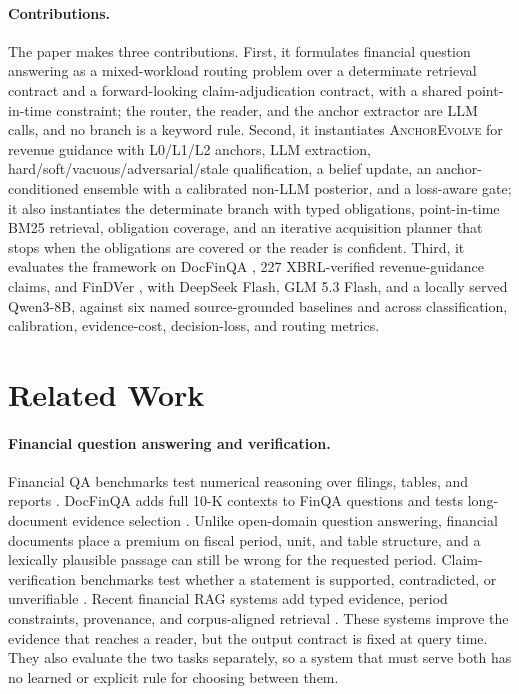 \documentclass[11pt]{article}
\newcommand{\anchor}{\textsc{AnchorEvolve}}
\begin{document}
\paragraph{Contributions.}
The paper makes three contributions. First, it formulates financial question answering as a mixed-workload routing problem over a determinate retrieval contract and a forward-looking claim-adjudication contract, with a shared point-in-time constraint; the router, the reader, and the anchor extractor are LLM calls, and no branch is a keyword rule. Second, it instantiates \anchor{} for revenue guidance with L0/L1/L2 anchors, LLM extraction, hard/soft/vacuous/adversarial/stale qualification, a belief update, an anchor-conditioned ensemble with a calibrated non-LLM posterior, and a loss-aware gate; it also instantiates the determinate branch with typed obligations, point-in-time BM25 retrieval, obligation coverage, and an iterative acquisition planner that stops when the obligations are covered or the reader is confident. Third, it evaluates the framework on DocFinQA \citep{reddy2024docfinqa}, 227 XBRL-verified revenue-guidance claims, and FinDVer \citep{zhao2024findver}, with DeepSeek Flash, GLM 5.3 Flash, and a locally served Qwen3-8B, against six named source-grounded baselines and across classification, calibration, evidence-cost, decision-loss, and routing metrics.

\section{Related Work}

\paragraph{Financial question answering and verification.}
Financial QA benchmarks test numerical reasoning over filings, tables, and reports \citep{chen2021finqa,zhu2021tatqa,islam2023financebench,xie2024finben}. DocFinQA adds full 10-K contexts to FinQA questions and tests long-document evidence selection \citep{reddy2024docfinqa}. Unlike open-domain question answering, financial documents place a premium on fiscal period, unit, and table structure, and a lexically plausible passage can still be wrong for the requested period. Claim-verification benchmarks test whether a statement is supported, contradicted, or unverifiable \citep{zhao2024findver,rangapur2025finfact}. Recent financial RAG systems add typed evidence, period constraints, provenance, and corpus-aligned retrieval \citep{mansouri2026finrank,jiang2026finrate,chen2026hcrag,chi2026finsagent,zhou2026fincards}. These systems improve the evidence that reaches a reader, but the output contract is fixed at query time. They also evaluate the two tasks separately, so a system that must serve both has no learned or explicit rule for choosing between them.
\end{document}
